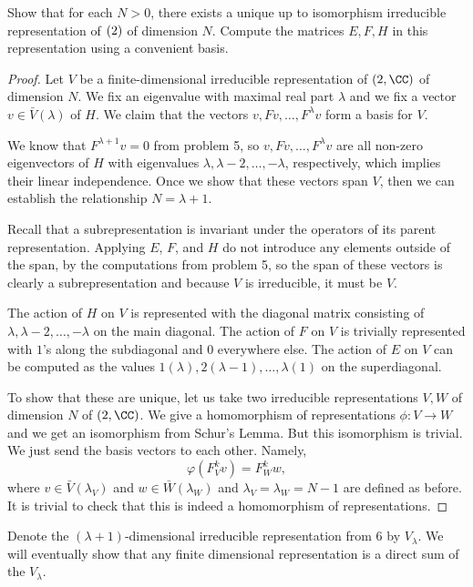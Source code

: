 \documentclass{article}
\begin{document}
\begin{prop}
Show that for each $N > 0$, there exists a unique up to isomorphism irreducible
representation of $\sl(2)$ of dimension $N$. Compute the matrices $E, F, H$ in
this representation using a convenient basis.
\end{prop}

\begin{proof}
Let $V$ be a finite-dimensional irreducible representation of $\sl(2, \CC)$ of
dimension $N$. We fix an eigenvalue with maximal real part $\lambda$ and we fix
a vector $v \in \bar{V}(\lambda)$ of $H$. We claim that the vectors $v, Fv,
\dots, F^{\lambda} v$ form a basis for $V$.

We know that $F^{\lambda + 1} v = 0$ from problem 5, so $v, Fv, \dots,
F^{\lambda} v$ are all non-zero eigenvectors of $H$ with eigenvalues $\lambda,
\lambda - 2, \dots, -\lambda$, respectively, which implies their linear
independence. Once we show that these vectors span $V$, then we can establish
the relationship $N = \lambda + 1$.

Recall that a subrepresentation is invariant under the operators of its parent
representation. Applying $E$, $F$, and $H$ do not introduce any elements outside
of the span, by the computations from problem 5, so the span of these vectors is
clearly a subrepresentation and because $V$ is irreducible, it must be $V$.

The action of $H$ on $V$ is represented with the diagonal matrix consisting of
$\lambda, \lambda - 2, \dots, -\lambda$ on the main diagonal. The action of $F$
on $V$ is trivially represented with $1$'s along the subdiagonal and $0$
everywhere else. The action of $E$ on $V$ can be computed as the values $1
(\lambda), 2 (\lambda - 1), \dots, \lambda (1)$ on the superdiagonal.

To show that these are unique, let us take two irreducible representations $V,
W$ of dimension $N$ of $\sl(2, \CC)$. We give a homomorphism of representations
$\phi : V \to W$ and we get an isomorphism from Schur's Lemma. But this
isomorphism is trivial.  We just send the basis vectors to each other. Namely,
\[ \varphi(F_V^k v) = F_W^k w, \]
where $v \in \bar{V}(\lambda_V)$ and $w \in \bar{W}(\lambda_W)$ and $\lambda_V =
\lambda_W = N - 1$ are defined as before. It is trivial to check that this is
indeed a homomorphism of representations.
\end{proof}

Denote the $(\lambda + 1)$-dimensional irreducible representation from 6 by
$V_{\lambda}$. We will eventually show that any finite dimensional
representation is a direct sum of the $V_{\lambda}$.
\end{document}
